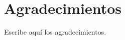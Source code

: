 \chapter*{Agradecimientos} %
    \begin{center}
        Escribe aquí los agradecimientos.
\end{center}